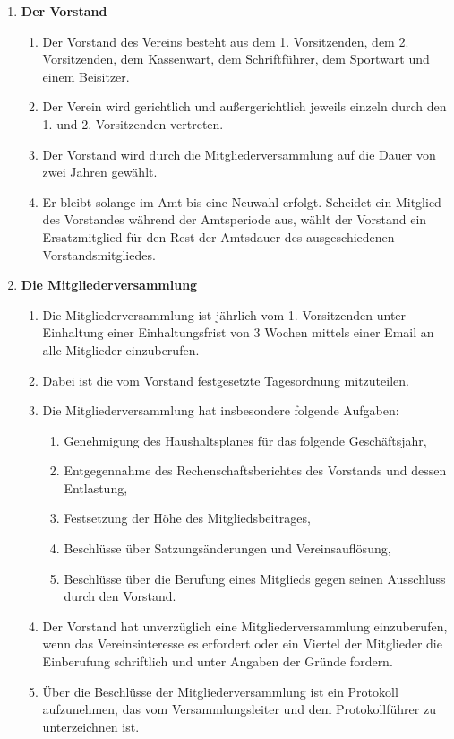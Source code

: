 \documentclass{article}
\begin{document}
\begin{enumerate}[§ 1.]
\item \textsf{\textbf{Der Vorstand}}
\begin{enumerate}
\item Der Vorstand des Vereins besteht aus dem 1. Vorsitzenden, dem 2. Vorsitzenden, dem Kassenwart, dem Schriftführer, dem Sportwart und einem Beisitzer.
\item Der Verein wird gerichtlich und außergerichtlich jeweils einzeln durch den 1. und 2. Vorsitzenden vertreten.
\item Der Vorstand wird durch die Mitgliederversammlung auf die Dauer von zwei Jahren gewählt.
\item Er bleibt solange im Amt bis eine Neuwahl erfolgt. Scheidet ein Mitglied des Vorstandes
während der Amtsperiode aus, wählt der Vorstand ein Ersatzmitglied für den Rest der Amtsdauer des ausgeschiedenen Vorstandsmitgliedes.
\end{enumerate}

\item \textsf{\textbf{Die Mitgliederversammlung}}
\begin{enumerate}
\item Die Mitgliederversammlung ist jährlich vom 1. Vorsitzenden unter Einhaltung einer Einhaltungsfrist von 3 Wochen mittels einer Email an alle Mitglieder einzuberufen.
\item Dabei ist die vom Vorstand festgesetzte Tagesordnung mitzuteilen.
\item Die Mitgliederversammlung hat insbesondere folgende Aufgaben:
\begin{enumerate}
\item Genehmigung des Haushaltsplanes für das folgende Geschäftsjahr,
\item Entgegennahme des Rechenschaftsberichtes des Vorstands und dessen
Entlastung,
\item Festsetzung der Höhe des Mitgliedsbeitrages,
\item Beschlüsse über Satzungsänderungen und Vereinsauflösung,
\item Beschlüsse über die Berufung eines Mitglieds gegen seinen Ausschluss durch den
Vorstand.
\end{enumerate}
\item Der Vorstand hat unverzüglich eine Mitgliederversammlung einzuberufen, wenn das
Vereinsinteresse es erfordert oder ein Viertel der Mitglieder die Einberufung schriftlich und unter
Angaben der Gründe fordern.
\item Über die Beschlüsse der Mitgliederversammlung ist ein Protokoll aufzunehmen, das vom
Versammlungsleiter und dem Protokollführer zu unterzeichnen ist.
\end{enumerate}


\end{enumerate}
\end{document}

